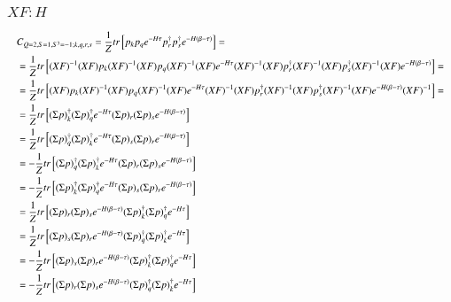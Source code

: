 \subsubsection{$XF : H$}

\begin{equation}
  \resizebox{\textwidth}{!}{%
  $
  \begin{aligned}
    &C_{Q=2,S=1,S^3=-1;k,q,r,s} = \frac{1}{Z}tr\left[p_kp_qe^{-H\tau}p^\dagger_rp^\dagger_se^{-H\left(\beta-\tau\right)}\right] = 
    \\
    &= \frac{1}{Z}tr\left[(XF)^{-1}(XF)p_k(XF)^{-1}(XF)p_q(XF)^{-1}(XF)e^{-H\tau}(XF)^{-1}(XF)p^\dagger_r(XF)^{-1}(XF)p^\dagger_s(XF)^{-1}(XF)e^{-H\left(\beta-\tau\right)}\right] = 
    \\
    &= \frac{1}{Z}tr\left[(XF)p_k(XF)^{-1}(XF)p_q(XF)^{-1}(XF)e^{-H\tau}(XF)^{-1}(XF)p^\dagger_r(XF)^{-1}(XF)p^\dagger_s(XF)^{-1}(XF)e^{-H\left(\beta-\tau\right)}(XF)^{-1}\right] = 
    \\
    &= \frac{1}{Z}tr\left[(\Sigma p)^\dagger_k(\Sigma p)^\dagger_qe^{-H\tau}(\Sigma p)_r(\Sigma p)_se^{-H\left(\beta-\tau\right)}\right]
    \\
    &= \frac{1}{Z}tr\left[(\Sigma p)^\dagger_q(\Sigma p)^\dagger_ke^{-H\tau}(\Sigma p)_s(\Sigma p)_re^{-H\left(\beta-\tau\right)}\right]
    \\
    &= - \frac{1}{Z}tr\left[(\Sigma p)^\dagger_q(\Sigma p)^\dagger_ke^{-H\tau}(\Sigma p)_r(\Sigma p)_se^{-H\left(\beta-\tau\right)}\right]
    \\
    &= - \frac{1}{Z}tr\left[(\Sigma p)^\dagger_k(\Sigma p)^\dagger_qe^{-H\tau}(\Sigma p)_s(\Sigma p)_re^{-H\left(\beta-\tau\right)}\right]
    \\
    &= \frac{1}{Z}tr\left[(\Sigma p)_r(\Sigma p)_se^{-H\left(\beta-\tau\right)}(\Sigma p)^\dagger_k(\Sigma p)^\dagger_qe^{-H\tau}\right]
    \\
    &= \frac{1}{Z}tr\left[(\Sigma p)_s(\Sigma p)_re^{-H\left(\beta-\tau\right)}(\Sigma p)^\dagger_q(\Sigma p)^\dagger_ke^{-H\tau}\right]
    \\
    &= - \frac{1}{Z}tr\left[(\Sigma p)_s(\Sigma p)_re^{-H\left(\beta-\tau\right)}(\Sigma p)^\dagger_k(\Sigma p)^\dagger_qe^{-H\tau}\right]
    \\
    &= - \frac{1}{Z}tr\left[(\Sigma p)_r(\Sigma p)_se^{-H\left(\beta-\tau\right)}(\Sigma p)^\dagger_q(\Sigma p)^\dagger_ke^{-H\tau}\right]
    \\
  \end{aligned}$}
\end{equation}

